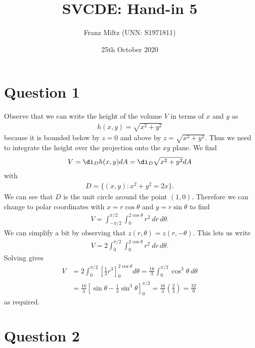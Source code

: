 \documentclass{article}
\begin{document}
\title{SVCDE: Hand-in 5}
\author{Franz Miltz (UNN: S1971811)}
\date{25th October 2020}
\maketitle


\section*{Question 1}


Observe that we can write the height of the volume $V$ in terms of $x$ and $y$ as 
\begin{align*}
  h(x,y) = \sqrt{x^2 + y^2}
\end{align*}
because it is bounded below by $z=0$ and above by $z=\sqrt{x^2 + y^2}$.
Thus we need to integrate the height over the projection onto the $xy$ plane. We find
\begin{align*}
  V = \di_D h(x,y)dA = \di_D \sqrt{x^2+y^2}dA
\end{align*}
with
\begin{align*}
  D = \{(x,y) : x^2 + y^2 = 2x\}.
\end{align*}
We can see that $D$ is the unit circle around the point $(1,0)$. Therefore we can 
change to polar coordinates with $x=r\cos\theta$ and $y=r\sin\theta$ to find
\begin{align*}
  V = \int_{-\pi/2}^{\pi/2}\int_0^{2\cos\theta} r^2\: dr\,d\theta.
\end{align*}
We can simplify a bit by observing that $z(r,\theta)=z(r,-\theta)$. This lets us write
\begin{align*}
  V = 2\int_{0}^{\pi/2}\int_0^{2\cos \theta} r^2\: dr\,d\theta.
\end{align*}
Solving gives 
\begin{align*}
  V &= 2\int_0^{\pi/2}\left[\frac{1}{3}r^3\right]_0^{2\cos \theta}d\theta
  =\frac{16}{3}\int_0^{\pi/2}\cos^3 \theta\:d\theta\\
  &=\frac{16}{3}\left[\sin \theta - \frac{1}{3}\sin^3 \theta\right]_0^{\pi/2}
  =\frac{16}{3}\left(\frac{2}{3}\right) = \frac{32}{9}
\end{align*}
as required.


\section*{Question 2}
\end{document}
